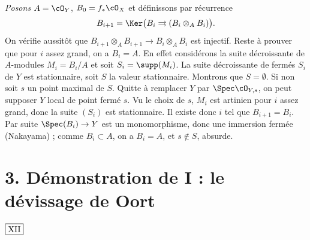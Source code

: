 \noindent\textit{Posons} $A = \cO_Y$, $B_0 = f_* \cO_X$ et définissons par récurrence
\[
B_{i+1} = \Ker\bigl(B_i \rightrightarrows (B_i \otimes_A B_i)\bigr).
\]
On vérifie aussitôt que $B_{i+1} \otimes_A B_{i+1} \to B_i \otimes_A B_i$ est injectif. Reste à prouver que pour $i$ assez grand, on a $B_i = A$. En effet considérons la suite décroissante de $A$-modules $M_i = B_i/A$ et soit $S_i = \supp(M_i)$. La suite décroissante de fermés $S_i$ de $Y$ est stationnaire, soit $S$ la valeur stationnaire. Montrons que $S = \emptyset$. Si non soit $s$ un point maximal de $S$. Quitte à remplacer $Y$ par $\Spec \cO_{Y,s}$, on peut supposer $Y$ local de point fermé $s$. Vu le choix de $s$, $M_i$ est artinien pour $i$ assez grand, donc la suite $(S_i)$ est stationnaire. Il existe donc $i$ tel que $B_{i+1} = B_i$. Par suite $\Spec(B_i) \to Y$ est un monomorphisme, donc une immersion fermée (Nakayama) ; comme $B_i \subset A$, on a $B_i = A$, et $s \not\in S$, absurde.

\section*{3. Démonstration de I : le dévissage de Oort}

\begin{flushright}
$\fbox{\text{XII}}$
\end{flushright}

